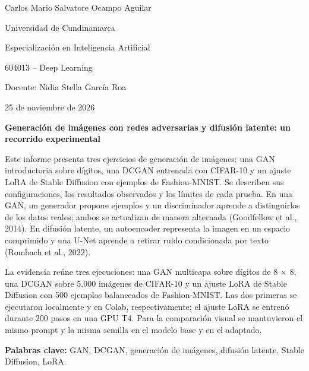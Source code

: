 \documentclass[12pt,letterpaper]{article}
\begin{document}
\raggedright
\begin{titlepage}\thispagestyle{fancy}\begin{center}
\vspace*{1.35in}{\bfseries Generación de imágenes con redes adversarias y difusión latente: un recorrido experimental\par}
\vspace{\baselineskip}
Carlos Mario Salvatore Ocampo Aguilar\par
Universidad de Cundinamarca\par
Especialización en Inteligencia Artificial\par
604013 -- Deep Learning\par
Docente: Nidia Stella García Roa\par
25 de noviembre de 2026\par
\end{center}\vfill\end{titlepage}
\setcounter{page}{2}

\begin{center}\textbf{Generación de imágenes con redes adversarias y difusión latente: un recorrido experimental}\end{center}
\indent Este informe presenta tres ejercicios de generación de imágenes: una GAN introductoria sobre dígitos, una DCGAN entrenada con CIFAR-10 y un ajuste LoRA de Stable Diffusion con ejemplos de Fashion-MNIST. Se describen sus configuraciones, los resultados observados y los límites de cada prueba. En una GAN, un generador propone ejemplos y un discriminador aprende a distinguirlos de los datos reales; ambos se actualizan de manera alternada (Goodfellow et al., 2014). En difusión latente, un autoencoder representa la imagen en un espacio comprimido y una U-Net aprende a retirar ruido condicionada por texto (Rombach et al., 2022).\par
\indent La evidencia reúne tres ejecuciones: una GAN multicapa sobre dígitos de 8 $\times$ 8, una DCGAN sobre 5.000 imágenes de CIFAR-10 y un ajuste LoRA de Stable Diffusion con 500 ejemplos balanceados de Fashion-MNIST. Las dos primeras se ejecutaron localmente y en Colab, respectivamente; el ajuste LoRA se entrenó durante 200 pasos en una GPU T4. Para la comparación visual se mantuvieron el mismo prompt y la misma semilla en el modelo base y en el adaptado.\par
\textbf{Palabras clave:} GAN, DCGAN, generación de imágenes, difusión latente, Stable Diffusion, LoRA.
\end{document}
